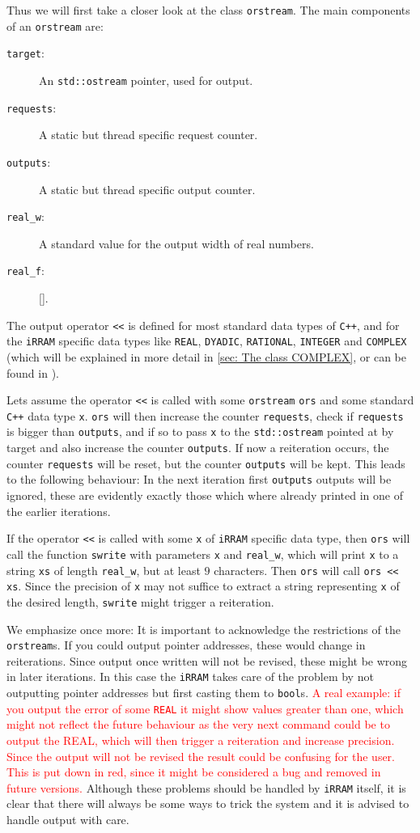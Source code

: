 \documentclass{article}
\newcommand{\irram}{\texttt{iRRAM}\xspace}
\newcommand{\cc}{\texttt{C++}\xspace}
\newcommand{\ir}[1]{\texttt{#1}}
\newcommand{\code}[1]{\texttt{#1}}
\newcommand{\temp}[1]{\textcolor{red}{#1}}
\begin{document}
Thus we will first take a closer look at the class \ir{orstream}. The main components of an \ir{orstream} are:
\begin{description}
\item[\code{target}:] An \code{std::ostream} pointer, used for output.
\item[\code{requests}:] A static but thread specific request counter.
\item[\code{outputs}:] A static but thread specific output counter.
\item[\code{real\_w}:] A standard value for the output width of real numbers.
\item[\code{real\_f}:] \ref{}.
\end{description}
The output operator \code{<<} is defined for most standard data types of \cc, and for the \irram specific data types like \ir{REAL}, \ir{DYADIC}, \ir{RATIONAL}, \ir{INTEGER} and \ir{COMPLEX} (which will be explained in more detail in \cref{sec: The class COMPLEX}, or can be found in \cite{}).

Lets assume the operator \code{<<} is called with some \ir{orstream} \code{ors} and some standard \cc data type \code{x}. \code{ors} will then increase the counter \code{requests}, check if \code{requests} is bigger than \code{outputs}, and if so to pass \code{x} to the \ir{std::ostream} pointed at by target and also increase the counter \code{outputs}. If now a reiteration occurs, the counter \code{requests} will be reset, but the counter \code{outputs} will be kept. This leads to the following behaviour: In the next iteration first \code{outputs} outputs will be ignored, these are evidently exactly those which where already printed in one of the earlier iterations.

If the operator \code{<<} is called with some \code{x} of \irram specific data type, then \code{ors} will call the function \ir{swrite} with parameters \code{x} and \ir{real\_w}, which will print \code{x} to a string \code{xs} of length \ir{real\_w}, but at least $9$ characters. Then \code{ors} will call \code{ors << xs}. Since the precision of \code{x} may not suffice to extract a string representing \code{x} of the desired length, \ir{swrite} might trigger a reiteration.

We emphasize once more: It is important to acknowledge the restrictions of the \ir{orstream}s. If you could output pointer addresses, these would change in reiterations. Since output once written will not be revised, these might be wrong in later iterations. In this case the \irram takes care of the problem by not outputting pointer addresses but first casting them to \code{bool}s. \temp{A real example: if you output the error of some \ir{REAL} it might show values greater than one, which might not reflect the future behaviour as the very next command could be to output the REAL, which will then trigger a reiteration and increase precision. Since the output will not be revised the result could be confusing for the user. This is put down in red, since it might be considered a bug and removed in future versions.} Although these problems should be handled by \irram itself, it is clear that there will always be some ways to trick the system and it is advised to handle output with care.
\end{document}
